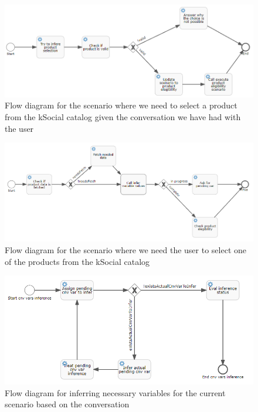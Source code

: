 \documentclass[a4paper,12pt,twoside]{ThesisStyle}
\begin{document}
\begin{figure}[htb]
  \centering
  \includegraphics[width=1\textwidth]{imatges/4_2_DsoExecuteProductSelectionScenario.png}
  \caption{Flow diagram for the scenario where we need to select a product from the kSocial catalog given the conversation we have had with the user}
  \label{fig:executeproductselectionscenario}
\end{figure}

\begin{figure}[htb]
  \centering
  \includegraphics[width=1\textwidth]{imatges/4_3_DsoProductElegibilityScenario.png}
  \caption{Flow diagram for the scenario where we need the user to select one of the products from the kSocial catalog}
  \label{fig:productelegibilityscenario}
\end{figure}

\begin{figure}[htb]
  \centering
  \includegraphics[width=1\textwidth]{imatges/5_InferVariablesProcess.png}
  \caption{Flow diagram for inferring necessary variables for the current scenario based on the conversation}
  \label{fig:infervariablesprocess}
\end{figure}
\end{document}
